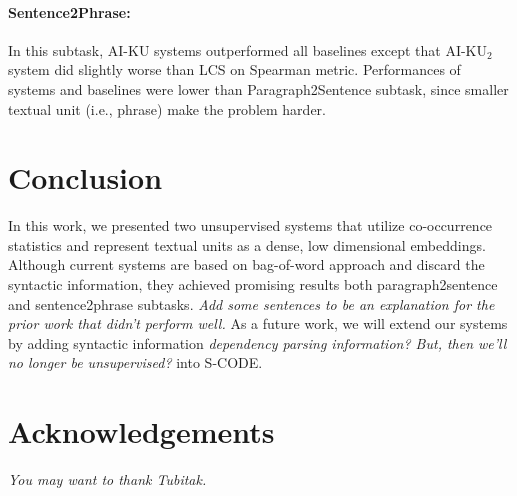 \documentclass[11pt]{article}
\begin{document}
\paragraph{Sentence2Phrase:} In this subtask, AI-KU systems outperformed all baselines except that AI-KU$_2$ system did slightly worse than LCS on Spearman metric. Performances of systems and baselines were lower than Paragraph2Sentence subtask, since smaller textual unit (i.e., phrase) make the problem harder.




\section{Conclusion}
\label{conclusion}

In this work, we presented two unsupervised systems that utilize co-occurrence statistics and represent textual units as a dense, low dimensional embeddings. 
Although current systems are based on bag-of-word approach and discard the syntactic information, they achieved promising results both paragraph2sentence and sentence2phrase subtasks. \emph{Add some sentences to be an explanation for the prior work that didn't perform well.} As a future work, we will extend our systems by adding syntactic information \emph{dependency parsing information? But, then we'll no longer be unsupervised?} into S-CODE.  



\section*{Acknowledgements}

\emph{You may want to thank Tubitak.}

\newpage


\end{document}
